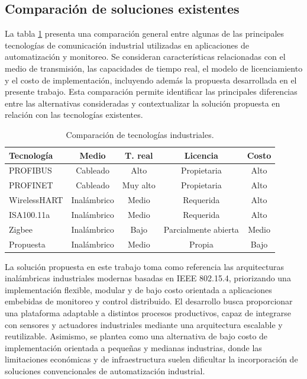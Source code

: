 \subsection{Comparación de soluciones existentes}
La tabla \ref{tab:comparacion_tecnologias} presenta una comparación general entre algunas de las principales tecnologías de comunicación industrial utilizadas en aplicaciones de automatización y monitoreo. Se consideran características relacionadas con el medio de transmisión, las capacidades de tiempo real, el modelo de licenciamiento y el costo de implementación, incluyendo además la propuesta desarrollada en el presente trabajo. Esta comparación permite identificar las principales diferencias entre las alternativas consideradas y contextualizar la solución propuesta en relación con las tecnologías existentes.

\begin{table}[htbp]
	\centering
	\caption[Comparación de tecnologías industriales]{Comparación de tecnologías industriales.}
	\begin{tabular}{l c c c c}
		\toprule
		\textbf{Tecnología} & \textbf{Medio} & \textbf{T. real} & \textbf{Licencia} & \textbf{Costo} \\
		\midrule
		PROFIBUS \cite{profibus_official} & Cableado & Alto & Propietaria & Alto \\
		
		PROFINET \cite{profinet_official} & Cableado & Muy alto & Propietaria & Alto \\
		
		WirelessHART \cite{wirelesshart_official} & Inalámbrico & Medio & Requerida & Alto \\
		
		ISA100.11a \cite{isa_official} & Inalámbrico & Medio & Requerida & Alto \\
		
		Zigbee \cite{zigbee_official} & Inalámbrico & Bajo & Parcialmente abierta & Medio \\
		
		Propuesta & Inalámbrico & Medio & Propia & Bajo \\
		\bottomrule
		\hline
	\end{tabular}
	\label{tab:comparacion_tecnologias}
\end{table}

La solución propuesta en este trabajo toma como referencia las arquitecturas inalámbricas industriales modernas basadas en IEEE 802.15.4, priorizando una implementación flexible, modular y de bajo costo orientada a aplicaciones embebidas de monitoreo y control distribuido. El desarrollo busca proporcionar una plataforma adaptable a distintos procesos productivos, capaz de integrarse con sensores y actuadores industriales mediante una arquitectura escalable y reutilizable. Asimismo, se plantea como una alternativa de bajo costo de implementación orientada a pequeñas y medianas industrias, donde las limitaciones económicas y de infraestructura suelen dificultar la incorporación de soluciones convencionales de automatización industrial.

